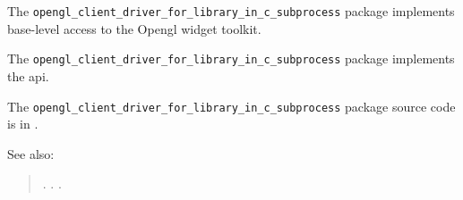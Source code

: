 
The {\tt opengl\_client\_driver\_for\_library\_in\_c\_subprocess} package implements base-level access to the Opengl widget 
toolkit.

The {\tt opengl\_client\_driver\_for\_library\_in\_c\_subprocess} package implements the  api.

The {\tt opengl\_client\_driver\_for\_library\_in\_c\_subprocess} package source code is in .

See also: 
\begin{quotation} 
.\newline 
{}.\newline 
{}.\newline 
\end{quotation} 


